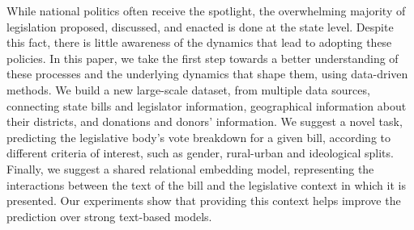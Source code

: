 While national politics often receive the spotlight, the overwhelming majority of legislation proposed, discussed, and enacted is done at the state level. Despite this fact, there is little awareness of the dynamics that lead to adopting these policies. In this paper, we take the first step towards a better understanding of these processes and the underlying dynamics that shape them, using data-driven methods. We build a new large-scale dataset, from multiple data sources, connecting state bills and legislator information, geographical information about their districts, and donations and donors' information. We suggest a novel task, predicting the legislative body's vote breakdown for a given bill, according to different criteria of interest, such as gender, rural-urban and ideological splits.  Finally, we suggest a shared relational embedding model, representing the interactions between the text of the bill and the legislative context in which it is presented. Our experiments show that providing this context helps improve the prediction over strong text-based models.
